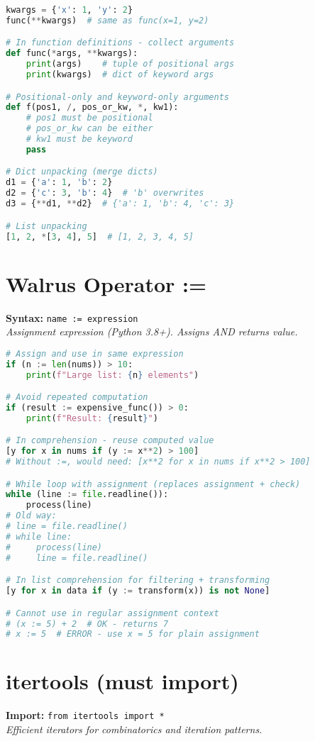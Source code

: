 \documentclass[8pt,landscape]{article}
\begin{document}
\begin{multicols}{3}
\begin{lstlisting}[language=Python]
kwargs = {'x': 1, 'y': 2}
func(**kwargs)  # same as func(x=1, y=2)

# In function definitions - collect arguments
def func(*args, **kwargs):
    print(args)    # tuple of positional args
    print(kwargs)  # dict of keyword args

# Positional-only and keyword-only arguments
def f(pos1, /, pos_or_kw, *, kw1):
    # pos1 must be positional
    # pos_or_kw can be either
    # kw1 must be keyword
    pass

# Dict unpacking (merge dicts)
d1 = {'a': 1, 'b': 2}
d2 = {'c': 3, 'b': 4}  # 'b' overwrites
d3 = {**d1, **d2}  # {'a': 1, 'b': 4, 'c': 3}

# List unpacking
[1, 2, *[3, 4], 5]  # [1, 2, 3, 4, 5]
\end{lstlisting}

\section*{Walrus Operator :=}
\textbf{Syntax:} \lstinline|name := expression| \\
\textit{Assignment expression (Python 3.8+). Assigns AND returns value.}

\begin{lstlisting}[language=Python]
# Assign and use in same expression
if (n := len(nums)) > 10:
    print(f"Large list: {n} elements")

# Avoid repeated computation
if (result := expensive_func()) > 0:
    print(f"Result: {result}")

# In comprehension - reuse computed value
[y for x in nums if (y := x**2) > 100]
# Without :=, would need: [x**2 for x in nums if x**2 > 100]

# While loop with assignment (replaces assignment + check)
while (line := file.readline()):
    process(line)
# Old way:
# line = file.readline()
# while line:
#     process(line)
#     line = file.readline()

# In list comprehension for filtering + transforming
[y for x in data if (y := transform(x)) is not None]

# Cannot use in regular assignment context
# (x := 5) + 2  # OK - returns 7
# x := 5  # ERROR - use x = 5 for plain assignment
\end{lstlisting}

\section*{itertools (must import)}
\textbf{Import:} \lstinline|from itertools import *| \\
\textit{Efficient iterators for combinatorics and iteration patterns.}


\end{multicols}
\end{document}
